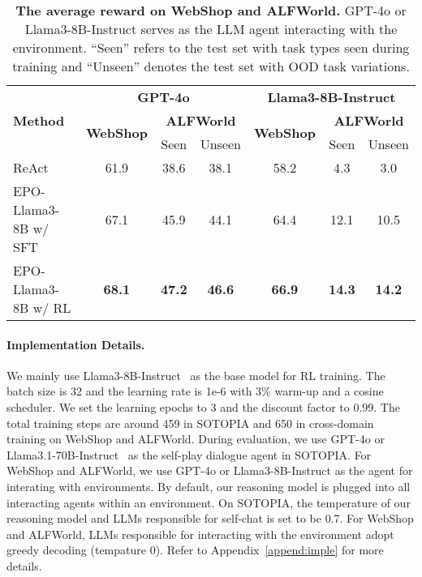 \begin{table*}[ht]
\centering
\begin{tabular}{lccc|ccc}
\toprule
\multirow{3}{*}{\textbf{Method}} & \multicolumn{3}{c}{\textbf{GPT-4o}} & \multicolumn{3}{c}{\textbf{Llama3-8B-Instruct}} \\
& \multirow{2}{*}{\textbf{WebShop}} & \multicolumn{2}{c}{\textbf{ALFWorld}} & \multirow{2}{*}{\textbf{WebShop}} & \multicolumn{2}{c}{\textbf{ALFWorld}} \\
\cmidrule{3-4} \cmidrule{6-7} 

  & &  {\small Seen} &  {\small Unseen} & &  {\small Seen} &  {\small Unseen} \\
\midrule
ReAct~\cite{yao2023react} & 61.9 & 38.6 & 38.1 & 58.2 & 4.3 & 3.0 \\
\midrule
EPO-Llama3-8B w/ SFT & 67.1 & 45.9 & 44.1 & 64.4 & 12.1 & 10.5 \\
EPO-Llama3-8B w/ RL & \textbf{68.1} & \textbf{47.2} & \textbf{46.6} & \textbf{66.9} & \textbf{14.3} & \textbf{14.2}\\
\bottomrule
\end{tabular}
\caption{\textbf{The average reward on WebShop and ALFWorld.}
GPT-4o or Llama3-8B-Instruct serves as the LLM agent interacting with the environment.
``Seen'' refers to the test set with task types seen during training and ``Unseen'' denotes the test set with OOD task variations.}
\label{tab:alshop-result}
\end{table*}



\paragraph{\textbf{Implementation Details.}}  
We mainly use Llama3-8B-Instruct~\cite{dubey2024llama} as the base model for RL training. 
The batch size is 32 and the learning rate is 1e-6 with 3\% warm-up and a cosine scheduler. We set the learning epochs to 3 and the discount factor to 0.99. 
The total training steps are around 459 in SOTOPIA and 650 in cross-domain training on WebShop and ALFWorld. During evaluation, we use GPT-4o or Llama3.1-70B-Instruct~\cite{llama-3.1} as the self-play dialogue agent in SOTOPIA. For WebShop and ALFWorld, we use GPT-4o or Llama3-8B-Instruct as the agent for interating with environments. 
By default, our reasoning model is plugged into all interacting agents within an environment.
On SOTOPIA, the temperature of our reasoning model and LLMs responsible for self-chat is set to be 0.7. 
For WebShop and ALFWorld, LLMs responsible for interacting with the environment adopt greedy decoding (tempature 0). 
Refer to Appendix~\ref{append:imple} for more details.



